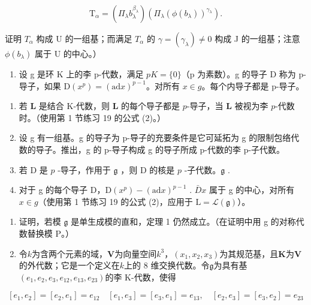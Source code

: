 \[
\mathrm{T} _ {\alpha} = (\Pi_ {\lambda} b _ {\lambda} ^ {\beta_ {\lambda}}) (\Pi_ {\lambda} (\phi (b _ {\lambda})) ^ {\gamma_ {\lambda}}).
\]

证明 \(T_{\alpha}\) 构成 U 的一组基；而满足 \(T_{\alpha}\) 的 \(\gamma = (\gamma_{\lambda}) \neq 0\) 构成 J 的一组基；注意 \(\phi(b_{\lambda})\) 属于 U 的中心。）

\begin{enumerate}
\def\labelenumi{\arabic{enumi}.}
\setcounter{enumi}{6}
\tightlist
\item
  设 g 是环 K 上的李 p-代数，满足 \(pK = \{0\}\)（p 为素数）。g 的导子 D 称为 p-导子，如果 \(\mathrm{D}(x^{p}) = (\mathrm{ad} x)^{p-1}\)。对所有 \(x \in g\)。每个内导子都是 p-导子。
\end{enumerate}

\begin{enumerate}
\def\labelenumi{(\alph{enumi})}
\item
  若 \(\mathbf{L}\) 是结合 K-代数，则 \(\mathbf{L}\) 的每个导子都是 \(p\)-导子，当 \(\mathbf{L}\) 被视为李 \(p\)-代数时。（使用第 1 节练习 19 的公式 (2)。）
\item
  设 g 有一组基。g 的导子为 p-导子的充要条件是它可延拓为 g 的限制包络代数的导子。推出，g 的 p-导子构成 g 的导子所成 p-代数的李 p-子代数。
\item
  若 D 是 \(p\) -导子，作用于 \(\mathfrak{g}\) ，则 D 的核是 \(p\) -子代数。\(\mathfrak{g}\) .
\item
  对于 g 的每个导子 D，\(\mathrm{D}(x^{p}) - (\mathrm{ad} x)^{p-1}\) . \(\bar{D}x\) 属于 g 的中心，对所有 \(x \in g\)（使用第 1 节练习 19 的公式 (2)，应用于 \(\mathrm{L} = \mathcal{L}(\mathfrak{g})\)）。
\end{enumerate}

\begin{enumerate}
\def\labelenumi{\arabic{enumi}.}
\setcounter{enumi}{7}
\item
  证明，若模 \(\mathfrak{g}\) 是单生成模的直和，定理 1 仍然成立。（在证明中用 g 的对称代数替换模 P。）
\item
  令\(k\)为含两个元素的域，\(\mathbf{V}\)为向量空间\(k^3\)，\((x_1, x_2, x_3)\)为其规范基，且\(\mathbf{K}\)为\(\mathbf{V}\)的外代数；它是一个定义在\(k\)上的 8 维交换代数。令\(\mathfrak{g}\)为具有基\((e_1, e_2, e_3, e_{12}, e_{13}, e_{23})\)的李 K-代数，使得
\end{enumerate}

\[
\left[ e _ {1}, e _ {2} \right] = \left[ e _ {2}, e _ {1} \right] = e _ {1 2} \quad \left[ e _ {1}, e _ {3} \right] = \left[ e _ {3}, e _ {1} \right] = e _ {1 3}, \quad \left[ e _ {2}, e _ {3} \right] = \left[ e _ {3}, e _ {2} \right] = e _ {2 3}
\]

